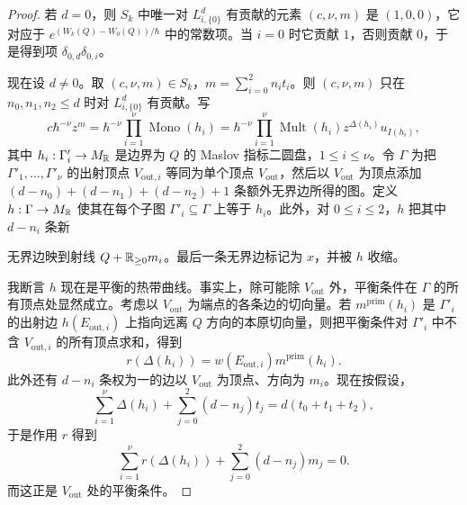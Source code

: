 \begin{proof}
若 $d=0$，则 $S_k$ 中唯一对 $L^d_{i,\{0\}}$ 有贡献的元素 $(c,\nu,m)$ 是 $(1,0,0)$，它对应于 $e^{(W_k(Q)-W_0(Q))/\hbar}$ 中的常数项。当 $i=0$ 时它贡献 $1$，否则贡献 $0$，于是得到项 $\delta_{0,d}\delta_{0,i}$。

现在设 $d\ne0$。取 $(c,\nu,m)\in S_k$，$m=\sum_{i=0}^{2}n_it_i$。则 $(c,\nu,m)$ 只在 $n_0,n_1,n_2\le d$ 时对 $L^d_{i,\{0\}}$ 有贡献。写
\[
  c\hbar^{-\nu}z^m=\hbar^{-\nu}\prod_{i=1}^{\nu}\operatorname{Mono}(h_i)
  =\hbar^{-\nu}\prod_{i=1}^{\nu}\operatorname{Mult}(h_i)z^{\Delta(h_i)}u_{I(h_i)},
\]
其中 $h_i:\Gamma'_i\to M_{\mathbb{R}}$ 是边界为 $Q$ 的 Maslov 指标二圆盘，$1\le i\le\nu$。令 $\Gamma$ 为把 $\Gamma'_1,\ldots,\Gamma'_\nu$ 的出射顶点 $V_{\mathrm{out},i}$ 等同为单个顶点 $V_{\mathrm{out}}$，然后以 $V_{\mathrm{out}}$ 为顶点添加 $(d-n_0)+(d-n_1)+(d-n_2)+1$ 条额外无界边所得的图。定义 $h:\Gamma\to M_{\mathbb{R}}$ 使其在每个子图 $\Gamma'_i\subseteq\Gamma$ 上等于 $h_i$。此外，对 $0\le i\le 2$，$h$ 把其中 $d-n_i$ 条新

无界边映到射线 $Q+\mathbb{R}_{\ge0}m_i$。最后一条无界边标记为 $x$，并被 $h$ 收缩。

我断言 $h$ 现在是平衡的热带曲线。事实上，除可能除 $V_{\mathrm{out}}$ 外，平衡条件在 $\Gamma$ 的所有顶点处显然成立。考虑以 $V_{\mathrm{out}}$ 为端点的各条边的切向量。若 $m^{\mathrm{prim}}(h_i)$ 是 $\Gamma'_i$ 的出射边 $h(E_{\mathrm{out},i})$ 上指向远离 $Q$ 方向的本原切向量，则把平衡条件对 $\Gamma'_i$ 中不含 $V_{\mathrm{out},i}$ 的所有顶点求和，得到
\[
  r(\Delta(h_i))=w(E_{\mathrm{out},i})m^{\mathrm{prim}}(h_i).
\]
此外还有 $d-n_i$ 条权为一的边以 $V_{\mathrm{out}}$ 为顶点、方向为 $m_i$。现在按假设，
\[
  \sum_{i=1}^{\nu}\Delta(h_i)+\sum_{j=0}^{2}(d-n_j)t_j=d(t_0+t_1+t_2),
\]
于是作用 $r$ 得到
\[
  \sum_{i=1}^{\nu}r(\Delta(h_i))+\sum_{j=0}^{2}(d-n_j)m_j=0.
\]
而这正是 $V_{\mathrm{out}}$ 处的平衡条件。


\end{proof}
